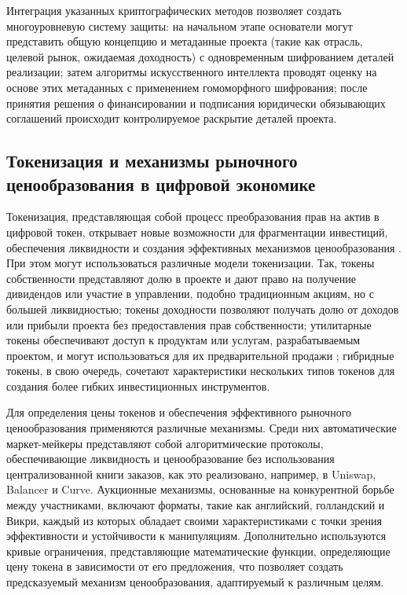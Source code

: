 \documentclass[
    candidate, %
    subf, %
    dotsinheaders=false,
]{disser}
\begin{document}
Интеграция указанных криптографических методов позволяет создать многоуровневую систему защиты: на начальном этапе основатели могут представить общую концепцию и метаданные проекта (такие как отрасль, целевой рынок, ожидаемая доходность) с одновременным шифрованием деталей реализации; затем алгоритмы искусственного интеллекта проводят оценку на основе этих метаданных с применением гомоморфного шифрования; после принятия решения о финансировании и подписания юридически обязывающих соглашений происходит контролируемое раскрытие деталей проекта.

\subsection{Токенизация и механизмы рыночного ценообразования в цифровой экономике}

Токенизация, представляющая собой процесс преобразования прав на актив в цифровой токен, открывает новые возможности для фрагментации инвестиций, обеспечения ликвидности и создания эффективных механизмов ценообразования \cite{cong2020tokenomics}. При этом могут использоваться различные модели токенизации. Так, токены собственности представляют долю в проекте и дают право на получение дивидендов или участие в управлении, подобно традиционным акциям, но с большей ликвидностью; токены доходности позволяют получать долю от доходов или прибыли проекта без предоставления прав собственности; утилитарные токены обеспечивают доступ к продуктам или услугам, разрабатываемым проектом, и могут использоваться для их предварительной продажи \cite{catalini2018initial}; гибридные токены, в свою очередь, сочетают характеристики нескольких типов токенов для создания более гибких инвестиционных инструментов.

Для определения цены токенов и обеспечения эффективного рыночного ценообразования применяются различные механизмы. Среди них автоматические маркет-мейкеры представляют собой алгоритмические протоколы, обеспечивающие ликвидность и ценообразование без использования централизованной книги заказов, как это реализовано, например, в Uniswap, Balancer и Curve. Аукционные механизмы, основанные на конкурентной борьбе между участниками, включают форматы, такие как английский, голландский и Викри, каждый из которых обладает своими характеристиками с точки зрения эффективности и устойчивости к манипуляциям. Дополнительно используются кривые ограничения, представляющие математические функции, определяющие цену токена в зависимости от его предложения, что позволяет создать предсказуемый механизм ценообразования, адаптируемый к различным целям.
\end{document}
